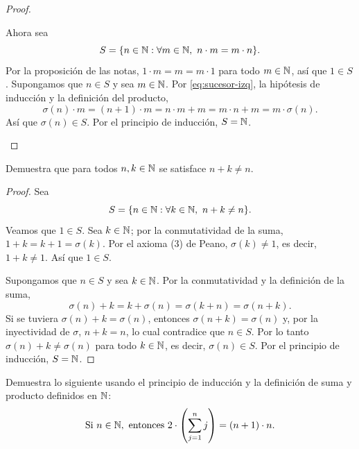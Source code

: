 \documentclass[12pt,a4paper]{article}
\begin{document}
\begin{proof}
\begin{enumerate}
            Ahora sea
            \begin{equation*}
                S=\{n\in\N : \forall m\in\N,\ n\cdot m=m\cdot n\}.
            \end{equation*}
            Por la proposición de las notas, $1\cdot m=m=m\cdot1$ para todo $m\in\mathbb{N}$, así que $1\in S$. Supongamos que
            $n\in S$ y sea $m\in\mathbb{N}$. Por \eqref{eq:sucesor-izq}, la hipótesis de inducción y la definición del producto,
            \begin{equation*}
                \sigma(n)\cdot m=(n+1)\cdot m=n\cdot m+m=m\cdot n+m=m\cdot\sigma(n).
            \end{equation*}
            Así que $\sigma(n)\in S$. Por el principio de inducción, $S=\mathbb{N}$. \qedhere
        \end{enumerate}
    \end{proof}

    \begin{problema}
        Demuestra que para todos $n,k\in\mathbb{N}$ se satisface $n+k\neq n$.
    \end{problema}

    \begin{proof}
        Sea
        \begin{equation*}
            S=\{n\in\mathbb{N} : \forall k\in\mathbb{N},\ n+k\neq n\}.
        \end{equation*}
        Veamos que $1\in S$. Sea $k\in\mathbb{N}$; por la conmutatividad de la suma, $1+k=k+1=\sigma(k)$. Por el axioma (3)
        de Peano, $\sigma(k)\neq1$, es decir, $1+k\neq1$. Así que $1\in S$.

        Supongamos que $n\in S$ y sea $k\in\mathbb{N}$. Por la conmutatividad y la definición de la suma,
        \begin{equation*}
            \sigma(n)+k=k+\sigma(n)=\sigma(k+n)=\sigma(n+k).
        \end{equation*}
        Si se tuviera $\sigma(n)+k=\sigma(n)$, entonces $\sigma(n+k)=\sigma(n)$ y, por la inyectividad de $\sigma$,
        $n+k=n$, lo cual contradice que $n\in S$. Por lo tanto $\sigma(n)+k\neq\sigma(n)$ para todo $k\in\mathbb{N}$, es decir,
        $\sigma(n)\in S$. Por el principio de inducción, $S=\mathbb{N}$.
    \end{proof}

    \begin{problema}
        Demuestra lo siguiente usando el principio de inducción y la definición de suma y producto definidos en $\mathbb{N}$:
        \begin{equation*}
            \text{Si } n\in\mathbb{N}, \text{ entonces } 2\cdot\left(\sum_{j=1}^{n} j\right)=(n+1)\cdot n.
        \end{equation*}
    \end{problema}
\end{document}
